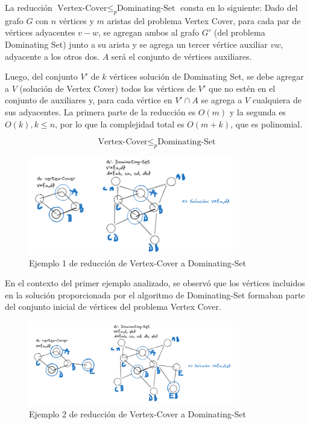 La reducción $\text{Vertex-Cover} \leq _{p} \text{Dominating-Set}$ consta en lo siguiente:
Dado del grafo $G$ con $n$ vértices y $m$ aristas del problema Vertex Cover, para cada par de 
vértices adyacentes $v-w$, se agregan ambos al grafo $G'$ (del problema Dominating Set) junto a 
su arista y se agrega un tercer vértice auxiliar $vw$, adyacente a los otros dos. $A$ será el 
conjunto de vértices auxiliares. 

Luego, del conjunto $V'$ de $k$ vértices solución de Dominating Set, se debe agregar a $V$ (solución de Vertex Cover) todos los vértices de $V'$ que no estén en el conjunto de auxiliares y, para cada vértice en $V' \cap A$ se agrega a $V$  cualquiera de sus adyacentes. La primera parte de la reducción es $O(m)$ y la segunda es $O(k),k \leq n$, por lo que la complejidad total es $O(m+k)$, que es polinomial.

\[\text{Vertex-Cover} \leq _{p} \text{Dominating-Set}\]

\begin{figure}[H]
    \centering
    \includegraphics[width=0.8\textwidth]{img/ejemplo1_VC-DS.png}
    \caption{Ejemplo 1 de reducción de Vertex-Cover a Dominating-Set}
    \label{fig:ejemplo1_VC-DS}
\end{figure}

En el contexto del primer ejemplo analizado, se observó que los vértices incluidos en la solución proporcionada por el algoritmo de Dominating-Set formaban parte del conjunto inicial de vértices del problema Vertex Cover. 

\begin{figure}[H]
    \centering
    \includegraphics[width=0.8\textwidth]{img/ejemplo2_VC-DS.png}
    \caption{Ejemplo 2 de reducción de Vertex-Cover a Dominating-Set}
    \label{fig:ejemplo2_VC-DS}
\end{figure}

